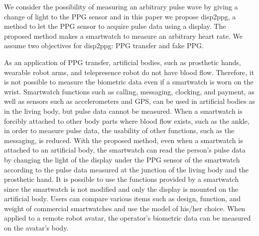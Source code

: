\documentclass[sigchi,authordraft]{acmart}
\begin{document}

We consider the possibility of measuring an arbitrary pulse wave by giving a change of light to the PPG sensor and in this paper we propose disp2ppg, a method to let the PPG sensor to acquire pulse data using a display. The proposed method makes a smartwatch to measure an arbitrary heart rate. We assume two objectives for disp2ppg: PPG transfer and fake PPG.

As an application of PPG transfer, artificial bodies, such as prosthetic hands, wearable robot arms, and telepresence robot do not have blood flow. Therefore, it is not possible to measure the biometric data even if a smartwatch is worn on the wrist. Smartwatch functions such as calling, messaging, clocking, and payment, as well as sensors such as accelerometers and GPS, can be used in artificial bodies as in the living body, but pulse data cannot be measured. When a smartwatch is forcibly attached to other body parts where blood flow exists, such as the ankle, in order to measure pulse data, the usability of other functions, such as the messaging, is reduced.
With the proposed method, even when a smartwatch is attached to an artificial body, the smartwatch can read the person's pulse data by changing the light of the display under the PPG sensor of the smartwatch according to the pulse data measured at the junction of the living body and the prosthetic hand. It is possible to use the functions provided by a smartwatch since the smartwatch is not modified and only the display is mounted on the artificial body. Users can compare various items such as design, function, and weight of commercial smartwatches and use the model of his/her choice. When applied to a remote robot avatar, the operator's biometric data can be measured on the avatar's body.\par
\end{document}
